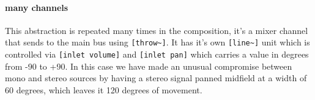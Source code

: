 \paragraph{many channels}
This abstraction is repeated many times in the composition, it's a mixer channel
that sends to the main bus using \verb+[throw~]+. It has it's own \verb+[line~]+
unit which is controlled via \verb+[inlet volume]+ and \verb+[inlet pan]+ which
carries a value in degrees from -90 to +90. In this case we have made an unusual
compromise between mono and stereo sources by having a stereo signal panned midfield
at a width of 60 degrees, which leaves it 120 degrees of movement. 
